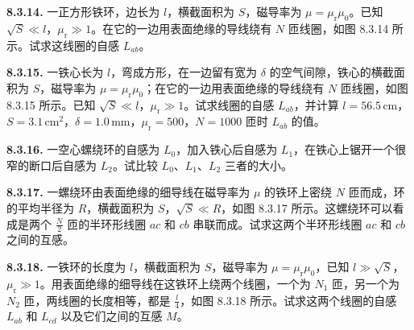 \textbf{8.3.14.} 一正方形铁环，边长为 $l$，横截面积为 $S$，磁导率为 $\mu = \mu_{\mathrm{r}} \mu_{0}$。已知 $\sqrt{S} \ll l$，$\mu_{\mathrm{r}} \gg 1$。在它的一边用表面绝缘的导线绕有 $N$ 匝线圈，如图 8.3.14 所示。试求这线圈的自感 $L_{ab}$。

\begin{center}
\end{center}

\vfill
\newpage

\textbf{8.3.15.} 一铁心长为 $l$，弯成方形，在一边留有宽为 $\delta$ 的空气间隙，铁心的横截面积为 $S$，磁导率为 $\mu = \mu_{\mathrm{r}} \mu_0$；在它的一边用表面绝缘的导线绕有 $N$ 匝线圈，如图 8.3.15 所示。已知 $\sqrt{S} \ll l$，$\mu_{\mathrm{r}} \gg 1$。试求线圈的自感 $L_{ab}$，并计算 $l = 56.5\,\mathrm{cm}$，$S = 3.1\,\mathrm{cm}^2$，$\delta = 1.0\,\mathrm{mm}$，$\mu_{\mathrm{r}} = 500$，$N = 1000$ 匝时 $L_{ab}$ 的值。

\begin{center}
\end{center}

\vfill
\newpage

\textbf{8.3.16.} 一空心螺绕环的自感为 $L_{0}$，加入铁心后自感为 $L_{1}$，在铁心上锯开一个很窄的断口后自感为 $L_{2}$。试比较 $L_{0}$、$L_{1}$、$L_{2}$ 三者的大小。

\vfill
\newpage

\textbf{8.3.17.} 一螺绕环由表面绝缘的细导线在磁导率为 $\mu$ 的铁环上密绕 $N$ 匝而成，环的平均半径为 $R$，横截面积为 $S$，$\sqrt{S} \ll R$，如图 8.3.17 所示。这螺绕环可以看成是两个 $\displaystyle \frac{N}{2}$ 匝的半环形线圈 $ac$ 和 $cb$ 串联而成。试求这两个半环形线圈 $ac$ 和 $cb$ 之间的互感。

\begin{center}
\end{center}

\vfill
\newpage

\textbf{8.3.18.} 一铁环的长度为 $l$，横截面积为 $S$，磁导率为 $\mu = \mu_{\mathrm{r}} \mu_0$，已知 $l \gg \sqrt{S}$，$\mu_{\mathrm{r}} \gg 1$。用表面绝缘的细导线在这铁环上绕两个线圈，一个为 $N_1$ 匝，另一个为 $N_2$ 匝，两线圈的长度相等，都是 $\displaystyle \frac{l}{4}$，如图 8.3.18 所示。试求这两个线圈的自感 $L_{ab}$ 和 $L_{cd}$ 以及它们之间的互感 $M$。

\begin{center}
\end{center}

